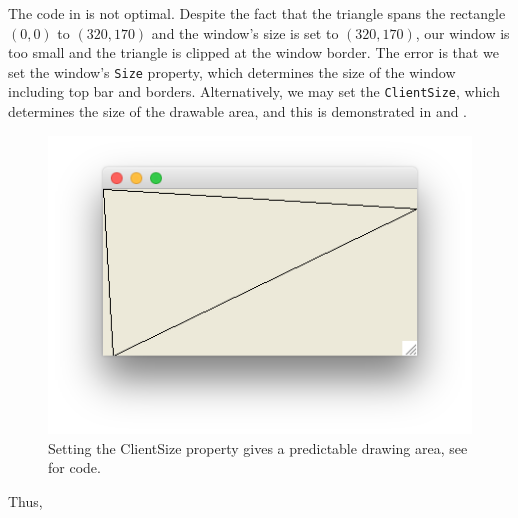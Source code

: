 \documentclass[fsharpNotes.tex]{subfiles}
\begin{document}
The code in  is not optimal. Despite the fact that the triangle spans the rectangle $(0,0)$ to $(320,170)$ and the window's size is set to $(320,170)$, our window is too small and the triangle is clipped at the window border. The error is that we set the window's \lstinline{Size} property, which determines the size of the window including top bar and borders. Alternatively, we may set the \lstinline{ClientSize}, which determines the size of the drawable area, and this is demonstrated in  and .
%
%
\begin{figure}
  \centering
  \includegraphics[scale=0.3]{triangleClientSize}
  \caption{Setting the ClientSize property gives a predictable drawing area, see  for code.}
  \label{fig:triangleClientSize}
\end{figure}
%
Thus, 
\end{document}

